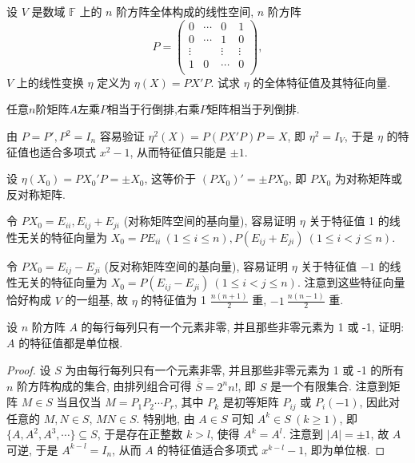\documentclass[../../main.tex]{subfiles}%
\begin{document}
\begin{example}
设 \( V \) 是数域 \( \mathbb{F} \) 上的 \( n \) 阶方阵全体构成的线性空间, \( n \) 阶方阵
\[
P=\left( \begin{matrix}
0&		\cdots&		0&		1\\
0&		\cdots&		1&		0\\
\vdots&		&		\vdots&		\vdots\\
1&		0&		\cdots&		0\\
\end{matrix} \right) ,
\]
\( V \) 上的线性变换 \( \eta \) 定义为 \( \eta(X) = PX'P \). 试求 \( \eta \) 的全体特征值及其特征向量.
\end{example}
\begin{note}
任意$n$阶矩阵$A$左乘$P$相当于行倒排,右乘$P$矩阵相当于列倒排.
\end{note}
\begin{solution}
由 \( P = P', P^2 = I_n \) 容易验证 \( \eta^2(X) = P(PX'P)P = X \), 即 \( \eta^2 = I_V \), 于是 \( \eta \) 的特征值也适合多项式 \( x^2 - 1 \), 从而特征值只能是 \( \pm 1 \).

设 \( \eta(X_0) = PX_0'P = \pm X_0 \), 这等价于 \( (PX_0)' = \pm PX_0 \), 即 \( PX_0 \) 为对称矩阵或反对称矩阵. 

令 \( PX_0 = E_{ii}, E_{ij} + E_{ji} \) (对称矩阵空间的基向量), 容易证明 \( \eta \) 关于特征值 1 的线性无关的特征向量为 \( X_0 = PE_{ii} \ (1 \leqslant  i \leqslant  n), P(E_{ij} + E_{ji}) \ (1 \leqslant  i < j \leqslant  n) \).

令 \( PX_0 = E_{ij} - E_{ji} \) (反对称矩阵空间的基向量), 容易证明 \( \eta \) 关于特征值 \( -1 \) 的线性无关的特征向量为 \( X_0 = P(E_{ij} - E_{ji}) \ (1 \leqslant  i < j \leqslant  n) \). 注意到这些特征向量恰好构成 \( V \) 的一组基, 故 \( \eta \) 的特征值为 1 \( \frac{n(n+1)}{2} \) 重, \( -1 \ \frac{n(n-1)}{2} \) 重.

\end{solution}

\begin{example}
设 \( n \) 阶方阵 \( A \) 的每行每列只有一个元素非零, 并且那些非零元素为 1 或 -1, 证明: \( A \) 的特征值都是单位根.
\end{example}
\begin{proof}
设 \( S \) 为由每行每列只有一个元素非零, 并且那些非零元素为 1 或 -1 的所有 \( n \) 阶方阵构成的集合, 由排列组合可得 \( \overline{\overline{S}} = 2^n n! \), 即 \( S \) 是一个有限集合. 注意到矩阵 \( M \in S \) 当且仅当 \( M = P_1 P_2 \cdots P_r \), 其中 \( P_k \) 是初等矩阵 \( P_{ij} \) 或 \( P_i(-1) \), 因此对任意的 \( M, N \in S \), \( MN \in S \). 特别地, 由 \( A \in S \) 可知 \( A^k \in S \ (k \geqslant  1) \), 即 \( \{A, A^2, A^3, \cdots\} \subseteq S \), 于是存在正整数 \( k > l \), 使得 \( A^k = A^l \). 注意到 \( |A| = \pm 1 \), 故 \( A \) 可逆, 于是 \( A^{k-l} = I_n \), 从而 \( A \) 的特征值适合多项式 \( x^{k-l} - 1 \), 即为单位根.
\end{proof}
\end{document}
